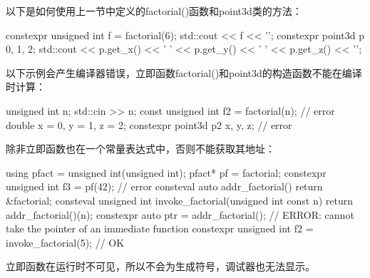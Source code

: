以下是如何使用上一节中定义的factorial()函数和point3d类的方法：

\begin{cpp}
constexpr unsigned int f = factorial(6);
std::cout << f << '\n';
constexpr point3d p {0, 1, 2};
std::cout << p.get_x() << ' ' << p.get_y() << ' ' << p.get_z() << '\n';
\end{cpp}

以下示例会产生编译器错误，立即函数factorial()和point3d的构造函数不能在编译时计算：

\begin{cpp}
unsigned int n;
std::cin >> n;
const unsigned int f2 = factorial(n); // error
double x = 0, y = 1, z = 2;
constexpr point3d p2 {x, y, z};       // error
\end{cpp}

除非立即函数也在一个常量表达式中，否则不能获取其地址：

\begin{cpp}
using pfact = unsigned int(unsigned int);
pfact* pf = factorial;
constexpr unsigned int f3 = pf(42);   // error
consteval auto addr_factorial()
{
    return &factorial;
}
consteval unsigned int invoke_factorial(unsigned int const n)
{
    return addr_factorial()(n);
}
constexpr auto ptr = addr_factorial();
// ERROR: cannot take the pointer of an immediate function
constexpr unsigned int f2 = invoke_factorial(5);
// OK
\end{cpp}

立即函数在运行时不可见，所以不会为生成符号，调试器也无法显示。

